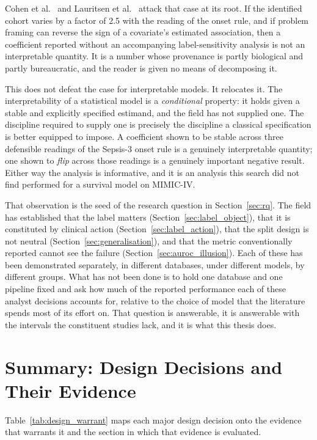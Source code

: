 Cohen et al.\ \cite{cohen2024subtle} and Lauritsen et al.\
\cite{lauritsen2021framing} attack that case at its root. If the identified
cohort varies by a factor of 2.5 with the reading of the onset rule, and if
problem framing can reverse the sign of a covariate's estimated association,
then a coefficient reported without an accompanying label-sensitivity analysis
is not an interpretable quantity. It is a number whose provenance is partly
biological and partly bureaucratic, and the reader is given no means of
decomposing it.

This does not defeat the case for interpretable models. It relocates it. The
interpretability of a statistical model is a \emph{conditional} property: it
holds given a stable and explicitly specified estimand, and the field has not
supplied one. The discipline required to supply one is precisely the discipline
a classical specification is better equipped to impose. A coefficient shown to
be stable across three defensible readings of the Sepsis-3 onset rule is a
genuinely interpretable quantity; one shown to \emph{flip} across those
readings is a genuinely important negative result. Either way the analysis is
informative, and it is an analysis this search did not find performed for a
survival model on MIMIC-IV.

That observation is the seed of the research question in
Section~\ref{sec:rq}. The field has established that the label matters
(Section~\ref{sec:label_object}), that it is constituted by clinical action
(Section~\ref{sec:label_action}), that the split design is not neutral
(Section~\ref{sec:generalisation}), and that the metric conventionally reported
cannot see the failure (Section~\ref{sec:auroc_illusion}). Each of these has
been demonstrated separately, in different databases, under different models,
by different groups. What has not been done is to hold one database and one
pipeline fixed and ask how much of the reported performance each of these
analyst decisions accounts for, relative to the choice of model that the
literature spends most of its effort on. That question is answerable, it is
answerable with the intervals the constituent studies lack, and it is what this
thesis does.


\section{Summary: Design Decisions and Their Evidence}
\label{sec:design_warrant}

Table~\ref{tab:design_warrant} maps each major design decision onto the
evidence that warrants it and the section in which that evidence is evaluated.

